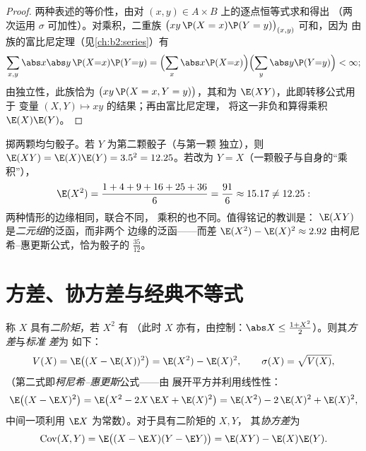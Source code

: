 \begin{proof}
两种表述的等价性，由对
$(x, y) \in A \times B$ 上的逐点恒等式求和得出
（两次运用 $\sigma$ 可加性）。对乘积，二重族
$\bigl(xy\,\P(X = x)\P(Y = y)\bigr)_{(x,y)}$ 可和，因为
由族的富比尼定理（见\cref{ch:b2:series}）有
\[
\sum_{x, y}\abs x \abs y\,\P(X{=}x)\P(Y{=}y)
= \Bigl(\sum_x \abs x \P(X{=}x)\Bigr)
\Bigl(\sum_y \abs y \P(Y{=}y)\Bigr) < \infty ;
\]
由独立性，此族恰为 $\bigl(xy\,\P(X = x, Y =
y)\bigr)$，其和为 $\E(XY)$，此即转移公式用于
变量 $(X, Y) \mapsto xy$ 的结果；再由富比尼定理，
将这一非负和算得乘积 $\E(X)\E(Y)$。
\end{proof}

\begin{example}\label{ex:b2:randomvar:productcontrast}
掷两颗均匀骰子。若 $Y$ 为第二颗骰子（与第一颗
独立），则 $\E(XY) = \E(X)\E(Y) = 3.5^2 = 12.25$。若改为
$Y = X$（一颗骰子与自身的“乘积”），
\[
\E(X^2) = \frac{1 + 4 + 9 + 16 + 25 + 36}{6} = \frac{91}{6}
\approx 15.17 \neq 12.25 :
\]
两种情形的边缘相同，联合不同，
乘积的也不同。值得铭记的教训是：
$\E(XY)$ 是\emph{二元组}的泛函，而非两个
边缘的泛函——而差 $\E(X^2) - \E(X)^2 \approx 2.92$
由柯尼希--惠更斯公式，恰为骰子的
$\frac{35}{12}$。
\end{example}

\section{方差、协方差与经典不等式}

\begin{definition}[矩与方差]\label{def:b2:randomvar:variance}
称 $X$ 具有\emph{二阶矩}，若 $X^2$ 有
（此时 $X$ 亦有，由控制：$\abs X \leq \frac{1 +
X^2}{2}$）。则其\emph{方差}与\emph{标准
差}为
如下：
\[
V(X) = \E\bigl((X - \E(X))^2\bigr)
= \E(X^2) - \E(X)^2 ,
\qquad
\sigma(X) = \sqrt{V(X)} ,
\]
（第二式即\emph{柯尼希--惠更斯}公式——由
展开平方并利用线性性：
\[
\E\bigl((X - \E X)^2\bigr)
= \E\bigl(X^2 - 2X\,\E X + \E(X)^2\bigr)
= \E(X^2) - 2\,\E(X)^2 + \E(X)^2 ,
\]
中间一项利用 $\E X$ 为常数）。对于具有二阶矩的 $X, Y$，
其\emph{协方差}为
\[
\operatorname{Cov}(X, Y)
= \E\bigl((X - \E X)(Y - \E Y)\bigr)
= \E(XY) - \E(X)\E(Y) .
\]
\end{definition}

